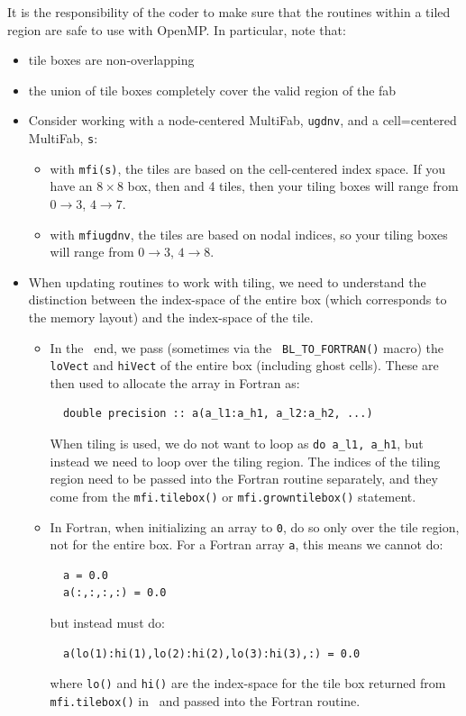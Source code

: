 It is the responsibility of the coder to make sure that the routines
within a tiled region are safe to use with OpenMP.  In particular,
note that:
\begin{itemize}
\item tile boxes are non-overlapping
\item the union of tile boxes completely cover the valid region of the
  fab
\item Consider working with a node-centered MultiFab, {\tt ugdnv}, and
  a cell=centered MultiFab, {\tt s}:
  \begin{itemize}

  \item with {\tt mfi(s)}, the tiles are based on the cell-centered
    index space.  If you have an $8\times 8$ box, then and 4 tiles,
    then your tiling boxes will range from $0\rightarrow 3$,
    $4\rightarrow 7$.

  \item with {\tt mfi{ugdnv}}, the tiles are based on nodal indices,
    so your tiling boxes will range from $0\rightarrow 3$,
    $4\rightarrow 8$.

  \end{itemize}

\item When updating routines to work with tiling, we need to
  understand the distinction between the index-space of the entire box
  (which corresponds to the memory layout) and the index-space of the
  tile.

  \begin{itemize}

  \item In the \cpp\ end, we pass (sometimes via the {\tt
    BL\_TO\_FORTRAN()} macro) the {\tt loVect} and {\tt hiVect} of the
    entire box (including ghost cells).  These are then used to
    allocate the array in Fortran as:
\begin{lstlisting}
  double precision :: a(a_l1:a_h1, a_l2:a_h2, ...)
\end{lstlisting}
    When tiling is used, we do not want to loop as {\tt do a\_l1,
      a\_h1}, but instead we need to loop over the tiling region.  The
    indices of the tiling region need to be passed into the Fortran
    routine separately, and they come from the {\tt mfi.tilebox()}
    or {\tt mfi.growntilebox()} statement.

  \item In Fortran, when initializing an array to {\tt 0}, do so only
    over the tile region, not for the entire box.  For a Fortran array
    {\tt a}, this means we cannot do:
\begin{lstlisting}
  a = 0.0
  a(:,:,:,:) = 0.0
\end{lstlisting}
    but instead must do:
\begin{lstlisting}
  a(lo(1):hi(1),lo(2):hi(2),lo(3):hi(3),:) = 0.0
\end{lstlisting}
    where {\tt lo()} and {\tt hi()} are the index-space for the tile box
    returned from {\tt mfi.tilebox()} in \cpp\ and passed into the Fortran
    routine.


\end{itemize}
\end{itemize}
